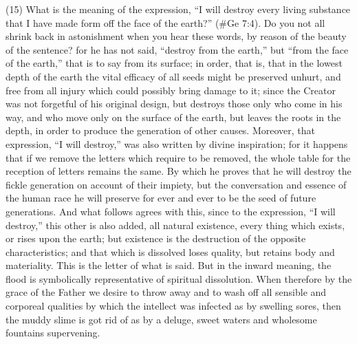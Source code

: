 (15) What is the meaning of the expression, ``I will destroy every living substance that I have made
form off the face of the earth?'' (\#Ge 7:4). Do you not all shrink back in astonishment when
you hear these words, by reason of the beauty of the sentence? for he has not said, ``destroy from
the earth,'' but ``from the face of the earth,'' that is to say from its surface; in order, that is, that in
the lowest depth of the earth the vital efficacy of all seeds might be preserved unhurt, and free
from all injury which could possibly bring damage to it; since the Creator was not forgetful of his
original design, but destroys those only who come in his way, and who move only on the surface of
the earth, but leaves the roots in the depth, in order to produce the generation of other causes.
Moreover, that expression, ``I will destroy,'' was also written by divine inspiration; for it happens that
if we remove the letters which require to be removed, the whole table for the reception of letters
remains the same. By which he proves that he will destroy the fickle generation on account of their
impiety, but the conversation and essence of the human race he will preserve for ever and ever to
be the seed of future generations. And what follows agrees with this, since to the expression, ``I will
destroy,'' this other is also added, all natural existence, every thing which exists, or rises upon the
earth; but existence is the destruction of the opposite characteristics; and that which is dissolved
loses quality, but retains body and materiality. This is the letter of what is said. But in the inward
meaning, the flood is symbolically representative of spiritual dissolution. When therefore by the
grace of the Father we desire to throw away and to wash off all sensible and corporeal qualities by
which the intellect was infected as by swelling sores, then the muddy slime is got rid of as by a
deluge, sweet waters and wholesome fountains supervening.

